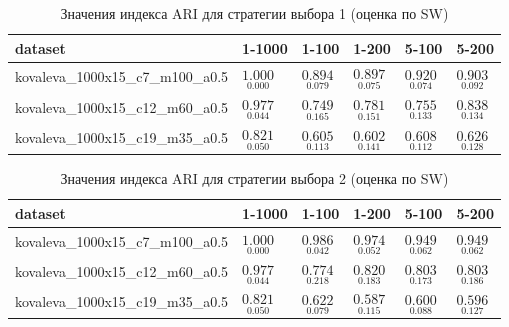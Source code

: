 \documentclass[12pt,twoside,a4paper,tikz,border=5]{refart}
\begin{document}
		\begin{table}[h!]
			\centering
			\caption{Значения индекса ARI для стратегии выбора 1 (оценка по SW) } \label{tab:ari-strategy1-sw}
			\begin{tabularx}{\textwidth}{|L{0.4\textwidth}|C{0.09\textwidth}|C{0.09\textwidth}|C{0.09\textwidth}|C{0.09\textwidth}|Z|}
				\hline
				dataset                           & 1-1000                      & 1-100                       &  1-200                      & 5-100                       & 5-200 \\ \hline
				kovaleva\_1000x15\_c7\_m100\_a0.5 & $ \underset{0.000}{1.000} $ & $ \underset{0.079}{0.894} $ & $ \underset{0.075}{0.897} $ & $ \underset{0.074}{0.920} $ & $ \underset{0.092}{0.903} $ \\ \hline
				kovaleva\_1000x15\_c12\_m60\_a0.5 & $ \underset{0.044}{0.977} $ & $ \underset{0.165}{0.749} $ & $ \underset{0.151}{0.781} $ & $ \underset{0.133}{0.755} $ & $ \underset{0.134}{0.838} $ \\ \hline
				kovaleva\_1000x15\_c19\_m35\_a0.5 & $ \underset{0.050}{0.821} $ & $ \underset{0.113}{0.605} $ & $ \underset{0.141}{0.602} $ & $ \underset{0.112}{0.608} $ & $ \underset{0.128}{0.626} $ \\ \hline
			\end{tabularx}
		\end{table}

		\begin{table}[h!]
			\centering
			\caption{Значения индекса ARI для стратегии выбора 2 (оценка по SW) } \label{tab:ari-strategy2-sw}
			\begin{tabularx}{\textwidth}{|L{0.4\textwidth}|C{0.09\textwidth}|C{0.09\textwidth}|C{0.09\textwidth}|C{0.09\textwidth}|Z|}
				\hline
				dataset                           & 1-1000                      & 1-100                       &  1-200                      & 5-100                       & 5-200 \\ \hline
				kovaleva\_1000x15\_c7\_m100\_a0.5 & $ \underset{0.000}{1.000} $ & $ \underset{0.042}{0.986} $ & $ \underset{0.052}{0.974} $ & $ \underset{0.062}{0.949} $ & $ \underset{0.062}{0.949} $ \\ \hline
				kovaleva\_1000x15\_c12\_m60\_a0.5 & $ \underset{0.044}{0.977} $ & $ \underset{0.218}{0.774} $ & $ \underset{0.183}{0.820} $ & $ \underset{0.173}{0.803} $ & $ \underset{0.186}{0.803} $ \\ \hline
				kovaleva\_1000x15\_c19\_m35\_a0.5 & $ \underset{0.050}{0.821} $ & $ \underset{0.079}{0.622} $ & $ \underset{0.115}{0.587} $ & $ \underset{0.088}{0.600} $ & $ \underset{0.127}{0.596} $ \\ \hline
			\end{tabularx}
		\end{table}
\end{document}
